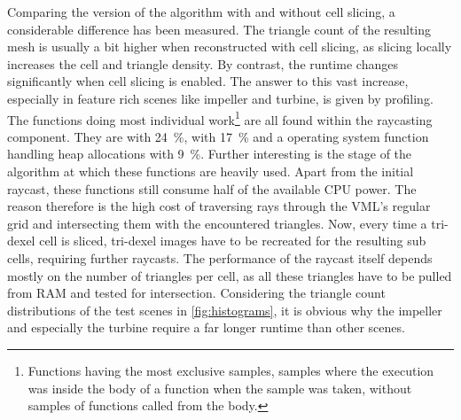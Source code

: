 Comparing the version of the algorithm with and without cell slicing, a considerable difference has been measured.
The triangle count of the resulting mesh is usually a bit higher when reconstructed with cell slicing, as slicing locally increases the cell and triangle density.
By contrast, the runtime changes significantly when cell slicing is enabled.
The answer to this vast increase, especially in feature rich scenes like impeller and turbine, is given by profiling.
The functions doing most individual work\footnote{
	Functions having the most exclusive samples, \ie samples where the execution was inside the body of a function when the sample was taken, without samples of functions called from the body.}
are all found within the raycasting component.
They are  with \SI{24}{\percent},  with \SI{17}{\percent} and a operating system function handling heap allocations with \SI{9}{\percent}.
Further interesting is the stage of the algorithm at which these functions are heavily used.
Apart from the initial raycast, these functions still consume half of the available CPU power.
The reason therefore is the high cost of traversing rays through the VML's regular grid and intersecting them with the encountered triangles.
Now, every time a tri-dexel cell is sliced, tri-dexel images have to be recreated for the resulting sub cells, requiring further raycasts.
The performance of the raycast itself depends mostly on the number of triangles per cell, as all these triangles have to be pulled from RAM and tested for intersection.
Considering the triangle count distributions of the test scenes in \cref{fig:histograms}, it is obvious why the impeller and especially the turbine require a far longer runtime than other scenes.

